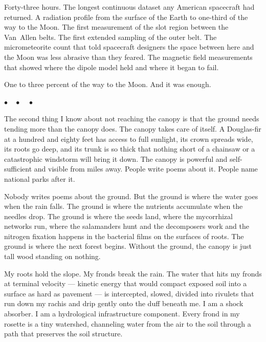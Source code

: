 \documentclass[12pt, letterpaper]{article}
\begin{document}
Forty-three hours. The longest continuous dataset any American spacecraft had returned. A radiation profile from the surface of the Earth to one-third of the way to the Moon. The first measurement of the slot region between the Van~Allen belts. The first extended sampling of the outer belt. The micrometeorite count that told spacecraft designers the space between here and the Moon was less abrasive than they feared. The magnetic field measurements that showed where the dipole model held and where it began to fail.

One to three percent of the way to the Moon. And it was enough.

\begin{center}
$\bullet\quad\bullet\quad\bullet$
\end{center}

The second thing I know about not reaching the canopy is that the ground needs tending more than the canopy does. The canopy takes care of itself. A Douglas-fir at a hundred and eighty feet has access to full sunlight, its crown spreads wide, its roots go deep, and its trunk is so thick that nothing short of a chainsaw or a catastrophic windstorm will bring it down. The canopy is powerful and self-sufficient and visible from miles away. People write poems about it. People name national parks after it.

Nobody writes poems about the ground. But the ground is where the water goes when the rain falls. The ground is where the nutrients accumulate when the needles drop. The ground is where the seeds land, where the mycorrhizal networks run, where the salamanders hunt and the decomposers work and the nitrogen fixation happens in the bacterial films on the surfaces of roots. The ground is where the next forest begins. Without the ground, the canopy is just tall wood standing on nothing.

My roots hold the slope. My fronds break the rain. The water that hits my fronds at terminal velocity --- kinetic energy that would compact exposed soil into a surface as hard as pavement --- is intercepted, slowed, divided into rivulets that run down my rachis and drip gently onto the duff beneath me. I am a shock absorber. I am a hydrological infrastructure component. Every frond in my rosette is a tiny watershed, channeling water from the air to the soil through a path that preserves the soil structure.
\end{document}
